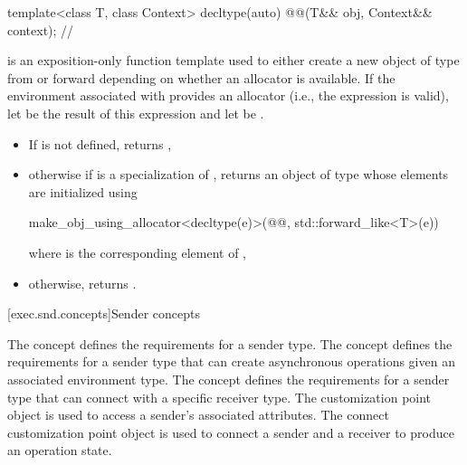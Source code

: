 \begin{itemdecl}
template<class T, class Context>
  decltype(auto) @@(T&& obj, Context&& context);       // \expos
\end{itemdecl}

\begin{itemdescr}
\pnum
{} is an exposition-only function template
used to either
create a new object of type  from 
or forward  depending on whether an allocator is available.
If the environment associated with  provides an allocator
(i.e., the expression  is valid),
let  be the result of this expression
and let  be .

\pnum
\returns
\begin{itemize}
\item
If  is not defined, returns ,
\item
otherwise if  is a specialization of ,
returns an object of type  whose elements are initialized using
\begin{codeblock}
make_obj_using_allocator<decltype(e)>(@@, std::forward_like<T>(e))
\end{codeblock}
where  is the corresponding element of ,
\item
otherwise, returns .
\end{itemize}
\end{itemdescr}

[exec.snd.concepts]{Sender concepts}

\pnum
The  concept defines
the requirements for a sender type.
The  concept defines
the requirements for a sender type
that can create asynchronous operations given an associated environment type.
The  concept defines
the requirements for a sender type
that can connect with a specific receiver type.
The  customization point object is used to access
a sender's associated attributes.
The connect customization point object is used to connect
a sender and a receiver to produce an operation state.

